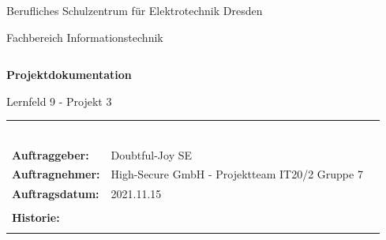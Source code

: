 \documentclass[a4paper,
    11pt,
    headings=small,
    ngerman,
    listof=totoc,
    numbers=noenddot]{scrreprt}[2021/11/13]
\begin{document}
\pagestyle{empty}


\begin{center}
  \Large{Berufliches Schulzentrum für Elektrotechnik Dresden}\\
\end{center}

\begin{center}
  \Large{Fachbereich Informationstechnik}
\end{center}
\begin{verbatim}

\end{verbatim}
\begin{center}
  \textbf{\LARGE{Projektdokumentation}}
\end{center}

\begin{center}
  \Large{Lernfeld 9 - Projekt 3}
\end{center}

\vspace{\fill}

\begin{flushleft}
  \begin{tabular}{lll}
                            &                                                & \\
                            &                                                & \\
                            &                                                & \\
                            &                                                & \\
                            &                                                & \\
                            &                                                & \\
    \textbf{Auftraggeber:}  & Doubtful-Joy SE                                & \\
    \textbf{Auftragnehmer:} & High-Secure GmbH - Projektteam IT20/2 Gruppe 7 & \\
    \textbf{Auftragsdatum:} & 2021.11.15                                     & \\
                            &                                                & \\
    \textbf{Historie:}
                            &                                                  \\
                            &                                                & \\
  \end{tabular}
\end{flushleft}
\end{document}
